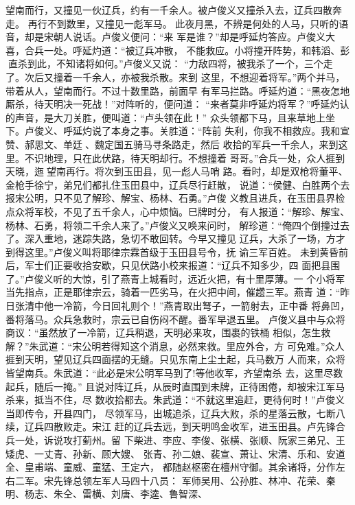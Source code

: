望南而行，又撞见一伙辽兵，约有一千余人。被卢俊义又撞杀入去，辽兵四散奔走。
再行不到数里，又撞见一彪军马。
此夜月黑，不辨是何处的人马，只听的语音，却是宋朝人说话。卢俊义便问：“来
军是谁？”却是呼延灼答应。卢俊义大喜，合兵一处。呼延灼道：“被辽兵冲散，
不能救应。小将撞开阵势，和韩滔、彭直杀到此，不知诸将如何。”卢俊义又说：
“力敌四将，被我杀了一个，三个走了。次后又撞着一千余人，亦被我杀散。来到
这里，不想迎着将军。”两个并马，带着从人，望南而行。不过十数里路，前面早
有军马拦路。呼延灼道：“黑夜怎地厮杀，待天明决一死战！”对阵听的，便问道：
“来者莫非呼延灼将军？”呼延灼认的声音，是大刀关胜，便叫道：“卢头领在此！”
众头领都下马，且来草地上坐下。卢俊义、呼延灼说了本身之事。关胜道：“阵前
失利，你我不相救应。我和宣赞、郝思文、单廷、魏定国五骑马寻条路走，然后
收拾的军兵一千余人，来到这里。不识地理，只在此伏路，待天明却行。不想撞着
哥哥。”合兵一处，众人捱到天晓，迤望南再行。将次到玉田县，见一彪人马哨
路。看时，却是双枪将董平、金枪手徐宁，弟兄们都扎住玉田县中，辽兵尽行赶散，
说道：“侯健、白胜两个去报宋公明，只不见了解珍、解宝、杨林、石勇。”卢俊
义教且进兵，在玉田县界检点众将军校，不见了五千余人，心中烦恼。巳牌时分，
有人报道：“解珍、解宝、杨林、石勇，将领二千余人来了。”卢俊义又唤来问时，
解珍道：“俺四个倒撞过去了。深入重地，迷踪失路，急切不敢回转。今早又撞见
辽兵，大杀了一场，方才到得这里。”卢俊义叫将耶律宗霖首级于玉田县号令，抚
谕三军百姓。
未到黄昏前后，军士们正要收拾安歇，只见伏路小校来报道：“辽兵不知多少，四
面把县围了。”卢俊义听的大惊，引了燕青上城看时，远近火把，有十里厚薄。一
个小将军当先指点，正是耶律宗云，骑着一匹劣马，在火把中间，催趱三军。燕青
道：“昨日张清中他一冷箭，今日回礼则个！”燕青取出弩子，一箭射去，正中番
将鼻凹，番将落马。众兵急救时，宗云已自伤闷不醒。番军早退五里。
卢俊义县中与众将商议：“虽然放了一冷箭，辽兵稍退，天明必来攻，围裹的铁桶
相似，怎生救解？”朱武道：“宋公明若得知这个消息，必然来救。里应外合，方
可免难。”众人捱到天明，望见辽兵四面摆的无缝。只见东南上尘土起，兵马数万
人而来，众将皆望南兵。朱武道：“此必是宋公明军马到了!等他收军，齐望南杀
去，这里尽数起兵，随后一掩。”
且说对阵辽兵，从辰时直围到未牌，正待困倦，却被宋江军马杀来，抵当不住，尽
数收拾都去。朱武道：“不就这里追赶，更待何时！”卢俊义当即传令，开县四门，
尽领军马，出城追杀，辽兵大败，杀的星落云散，七断八续，辽兵四散败走。宋江
赶的辽兵去远，到天明鸣金收军，进玉田县。卢先锋合兵一处，诉说攻打蓟州。留
下柴进、李应、李俊、张横、张顺、阮家三弟兄、王矮虎、一丈青、孙新、顾大嫂、
张青、孙二娘、裴宣、萧让、宋清、乐和、安道全、皇甫端、童威、童猛、王定六，
都随赵枢密在檀州守御。其余诸将，分作左右二军。宋先锋总领左军人马四十八员：
军师吴用、公孙胜、林冲、花荣、秦明、杨志、朱仝、雷横、刘唐、李逵、鲁智深、
